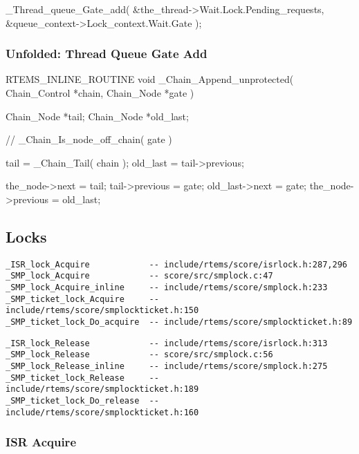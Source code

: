 \begin{nicec}
    _Thread_queue_Gate_add(
      &the_thread->Wait.Lock.Pending_requests,
      &queue_context->Lock_context.Wait.Gate
    );
\end{nicec}

\subsubsection{Unfolded: Thread Queue Gate Add}

\begin{nicec}
RTEMS_INLINE_ROUTINE void _Chain_Append_unprotected(
  Chain_Control *chain,
  Chain_Node    *gate
)
{
  Chain_Node *tail;
  Chain_Node *old_last;

  // _Chain_Is_node_off_chain( gate )

  tail = _Chain_Tail( chain );
  old_last = tail->previous;

  the_node->next = tail;
  tail->previous = gate;
  old_last->next = gate;
  the_node->previous = old_last;
}
\end{nicec}

\newpage
\subsection{Locks}

\begin{verbatim}
_ISR_lock_Acquire            -- include/rtems/score/isrlock.h:287,296
_SMP_lock_Acquire            -- score/src/smplock.c:47
_SMP_lock_Acquire_inline     -- include/rtems/score/smplock.h:233
_SMP_ticket_lock_Acquire     -- include/rtems/score/smplockticket.h:150
_SMP_ticket_lock_Do_acquire  -- include/rtems/score/smplockticket.h:89
\end{verbatim}

\begin{verbatim}
_ISR_lock_Release            -- include/rtems/score/isrlock.h:313
_SMP_lock_Release            -- score/src/smplock.c:56
_SMP_lock_Release_inline     -- include/rtems/score/smplock.h:275
_SMP_ticket_lock_Release     -- include/rtems/score/smplockticket.h:189
_SMP_ticket_lock_Do_release  -- include/rtems/score/smplockticket.h:160
\end{verbatim}

\subsubsection{ISR Acquire}

